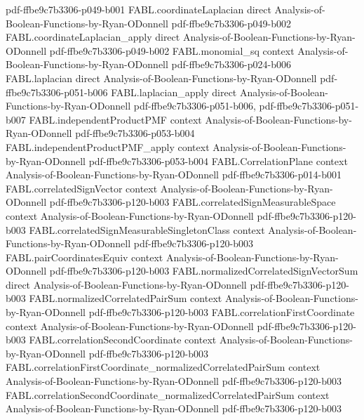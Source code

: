 \begin{theorem}
  {pdf-ffbe9c7b3306-p049-b001}
\proofstep
  {FABL.coordinateLaplacian}
  {direct}
  {Analysis-of-Boolean-Functions-by-Ryan-ODonnell}
  {pdf-ffbe9c7b3306-p049-b002}
\proofstep
  {FABL.coordinateLaplacian_apply}
  {direct}
  {Analysis-of-Boolean-Functions-by-Ryan-ODonnell}
  {pdf-ffbe9c7b3306-p049-b002}
\proofstep
  {FABL.monomial_sq}
  {context}
  {Analysis-of-Boolean-Functions-by-Ryan-ODonnell}
  {pdf-ffbe9c7b3306-p024-b006}
\proofstep
  {FABL.laplacian}
  {direct}
  {Analysis-of-Boolean-Functions-by-Ryan-ODonnell}
  {pdf-ffbe9c7b3306-p051-b006}
\proofstep
  {FABL.laplacian_apply}
  {direct}
  {Analysis-of-Boolean-Functions-by-Ryan-ODonnell}
  {pdf-ffbe9c7b3306-p051-b006,
    pdf-ffbe9c7b3306-p051-b007}
\proofstep
  {FABL.independentProductPMF}
  {context}
  {Analysis-of-Boolean-Functions-by-Ryan-ODonnell}
  {pdf-ffbe9c7b3306-p053-b004}
\proofstep
  {FABL.independentProductPMF_apply}
  {context}
  {Analysis-of-Boolean-Functions-by-Ryan-ODonnell}
  {pdf-ffbe9c7b3306-p053-b004}
\proofstep
  {FABL.CorrelationPlane}
  {context}
  {Analysis-of-Boolean-Functions-by-Ryan-ODonnell}
  {pdf-ffbe9c7b3306-p014-b001}
\proofstep
  {FABL.correlatedSignVector}
  {context}
  {Analysis-of-Boolean-Functions-by-Ryan-ODonnell}
  {pdf-ffbe9c7b3306-p120-b003}
\proofstep
  {FABL.correlatedSignMeasurableSpace}
  {context}
  {Analysis-of-Boolean-Functions-by-Ryan-ODonnell}
  {pdf-ffbe9c7b3306-p120-b003}
\proofstep
  {FABL.correlatedSignMeasurableSingletonClass}
  {context}
  {Analysis-of-Boolean-Functions-by-Ryan-ODonnell}
  {pdf-ffbe9c7b3306-p120-b003}
\proofstep
  {FABL.pairCoordinatesEquiv}
  {context}
  {Analysis-of-Boolean-Functions-by-Ryan-ODonnell}
  {pdf-ffbe9c7b3306-p120-b003}
\proofstep
  {FABL.normalizedCorrelatedSignVectorSum}
  {direct}
  {Analysis-of-Boolean-Functions-by-Ryan-ODonnell}
  {pdf-ffbe9c7b3306-p120-b003}
\proofstep
  {FABL.normalizedCorrelatedPairSum}
  {context}
  {Analysis-of-Boolean-Functions-by-Ryan-ODonnell}
  {pdf-ffbe9c7b3306-p120-b003}
\proofstep
  {FABL.correlationFirstCoordinate}
  {context}
  {Analysis-of-Boolean-Functions-by-Ryan-ODonnell}
  {pdf-ffbe9c7b3306-p120-b003}
\proofstep
  {FABL.correlationSecondCoordinate}
  {context}
  {Analysis-of-Boolean-Functions-by-Ryan-ODonnell}
  {pdf-ffbe9c7b3306-p120-b003}
\proofstep
  {FABL.correlationFirstCoordinate_normalizedCorrelatedPairSum}
  {context}
  {Analysis-of-Boolean-Functions-by-Ryan-ODonnell}
  {pdf-ffbe9c7b3306-p120-b003}
\proofstep
  {FABL.correlationSecondCoordinate_normalizedCorrelatedPairSum}
  {context}
  {Analysis-of-Boolean-Functions-by-Ryan-ODonnell}
  {pdf-ffbe9c7b3306-p120-b003}

\end{theorem}
